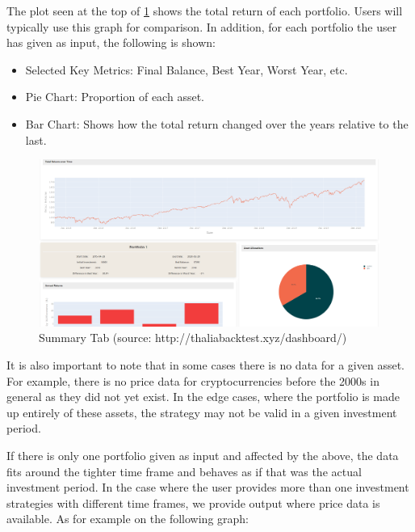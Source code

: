 \documentclass[main.tex]{subfiles}
\begin{document}
The plot seen at the top of \figurename{\ref{summary}} shows the total return of each portfolio. Users will typically use this graph for comparison. In addition, for each portfolio the user has given as input, the following is shown:

\begin{itemize}

    \item Selected Key Metrics: Final Balance, Best Year, Worst Year, etc.

    \item Pie Chart: Proportion of each asset.

    \item Bar Chart: Shows how the total return changed over the years relative to the last.

\end{itemize}

\begin{figure}[H]

   \centering

   \includegraphics[width=\textwidth]{08Appendices/081User/081Pictures/summary.png}

   \caption{Summary Tab (source: http://thaliabacktest.xyz/dashboard/)}

   \label{summary}

\end{figure}



It is also important to note that in some cases there is no data for a given asset. For example, there is no price data for cryptocurrencies before the 2000s in general as they did not yet exist. In the edge cases, where the portfolio is made up entirely of these assets, the strategy may not be valid in a given investment period. 



If there is only one portfolio given as input and affected by the above, the data fits around the tighter time frame and behaves as if that was the actual investment period. In the case where the user provides more than one investment strategies with different time frames, we provide output where price data is available. As for example on the following graph:
\end{document}

